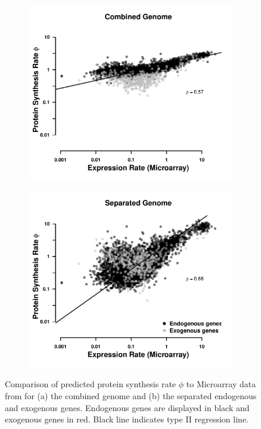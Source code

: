 \documentclass[12pt]{article}
\begin{document}
\begin{figure}[t]
    \centering
    \begin{subfigure}
        \centering
        \includegraphics[width=.45\textwidth]{img/phi_corr_plot_whole_Genome_estim.pdf}
    \end{subfigure}
    \begin{subfigure}
        \centering
        \includegraphics[width=.45\textwidth]{img/phi_corr_plot_split_Genome_estim.pdf}
    \end{subfigure}
    \caption{Comparison of predicted protein synthesis rate $\phi$ to Microarray data from \citet{tsankov2010} for (a) the combined genome and (b) the separated endogenous and exogenous genes. Endogenous genes are displayed in black and exogenous genes in red. Black line indicates type II regression line.}
    \label{fig:phi_corr_two_cond}
\end{figure}
\end{document}
